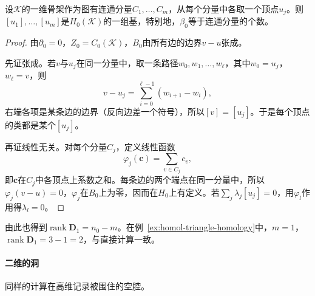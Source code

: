 \begin{theorem}[零维同调计数连通分量]
\label{thm:homol-h0-components}
设$\mathcal K$的一维骨架作为图有连通分量$C_1,\ldots,C_m$，从每个分量中各取一个顶点$u_j$。则$[u_1],\ldots,[u_m]$是$H_0(\mathcal K)$的一组基，特别地，$\beta_0$等于连通分量的个数。
\end{theorem}

\begin{proof}
由$\partial_0=0$，$Z_0=C_0(\mathcal K)$，$B_0$由所有边的边界$v-u$张成。

先证张成。若$v$与$u_j$在同一分量中，取一条路径$w_0,w_1,\ldots,w_\ell$，其中$w_0=u_j$，$w_\ell=v$，则
\[
 v-u_j=\sum_{i=0}^{\ell-1}(w_{i+1}-w_i),
\]
右端各项是某条边的边界（反向边差一个符号），所以$[v]=[u_j]$。于是每个顶点的类都是某个$[u_j]$。

再证线性无关。对每个分量$C_j$，定义线性函数
\[
 \varphi_j(\bm c)=\sum_{v\in C_j}c_v,
\]
即$\bm c$在$C_j$中各顶点上系数之和。每条边的两个端点在同一分量中，所以$\varphi_j(v-u)=0$，$\varphi_j$在$B_0$上为零，因而在$H_0$上有定义。若$\sum_j\lambda_j[u_j]=0$，用$\varphi_l$作用得$\lambda_l=0$。
\end{proof}

由此也得到$\operatorname{rank}\bm D_1=n_0-m$。在例~\ref{ex:homol-triangle-homology}中，$m=1$，$\operatorname{rank}\bm D_1=3-1=2$，与直接计算一致。

\paragraph{二维的洞}
同样的计算在高维记录被围住的空腔。

